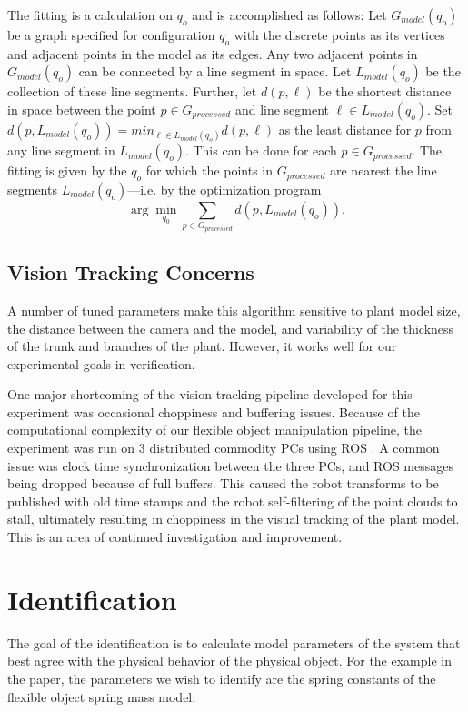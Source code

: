 \documentclass[runningheads,a4paper]{llncs}
\begin{document}
The fitting is a calculation on $q_o$ and is accomplished as follows: Let $G_{model}(q_o)$ be a graph specified for configuration $q_o$ with the discrete points as its vertices and adjacent points in the model as its edges. Any two adjacent points in $G_{model}(q_o)$ can be connected by a line segment in space. Let $L_{model}(q_o)$ be the collection of these line segments. Further, let $d(p,\ell)$ be the shortest distance in space between the point $p\in G_{processed}$ and line segment $\ell \in L_{model}(q_o)$. Set $d(p,L_{model}(q_o)) = min_{\ell\in L_{model}(q_o)} d(p,\ell)$ as the least distance for $p$ from any line segment in $L_{model}(q_o)$. This can be done for each $p\in G_{processed}$. The fitting is given by the $q_o$ for which the points in $G_{processed}$ are nearest the line segments $L_{model}(q_o)$---i.e. by the optimization program
\[
\arg \min_{q_0} \sum_{p\in G_{processed}} d(p,L_{model}(q_o)).
\]

\subsection{Vision Tracking Concerns}

A number of tuned parameters make this algorithm sensitive to plant model size, the distance between the camera and the model, and variability of the thickness of the trunk and branches of the plant. However, it works well for our experimental goals in verification.

One major shortcoming of the vision tracking pipeline developed for this experiment was occasional choppiness and buffering issues. Because of the computational complexity of our flexible object manipulation pipeline, the experiment was run on 3 distributed commodity PCs using ROS \cite{quigley2009ros}. A common issue was clock time synchronization between the three PCs, and ROS messages being dropped because of full buffers. This caused the robot transforms to be published with old time stamps and the robot self-filtering of the point clouds to stall, ultimately resulting in choppiness in the visual tracking of the plant model. This is an area of continued investigation and improvement. 

\section{Identification}
The goal of the identification is to calculate model parameters of the system that best agree with the physical behavior of the physical object. For the example in the paper, the parameters we wish to identify are the spring constants of the flexible object spring mass model. 
\end{document}
